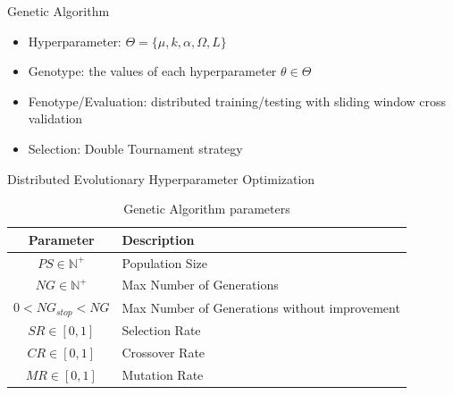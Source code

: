 \documentclass{beamer}
\begin{document}
\begin{frame}{Genetic Algorithm}
\linespread{2}
\begin{itemize}
    \item Hyperparameter: $\Theta = \{\mu,k,\alpha,\Omega,L\}$
    \item Genotype: the values of each hyperparameter $\theta \in \Theta$
    \item Fenotype/Evaluation: distributed training/testing with sliding window cross validation
    \item Selection: Double Tournament strategy 
\end{itemize}
\end{frame}


\begin{frame}{Distributed Evolutionary Hyperparameter Optimization}
\begin{table}[htb]
    \centering
    \begin{tabular}{|c|p{7cm}|} \hline
        \textbf{Parameter} & \textbf{Description}  \\ \hline
         $PS \in \mathbb{N}^+$ & Population Size \\ \hline
         $NG \in \mathbb{N}^+$ & Max Number of Generations \\ \hline 
         $0 < NG_{stop} < NG$ & Max Number of Generations without improvement \\ \hline 
         $SR \in [0,1]$ & Selection Rate \\ \hline 
         $CR \in [0,1]$ & Crossover Rate \\ \hline 
         $MR \in [0,1]$ & Mutation Rate \\ \hline 
    \end{tabular}
    \caption{Genetic Algorithm parameters}
    \label{tab:genetic_algoritm}
\end{table}
\end{frame}
\end{document}

